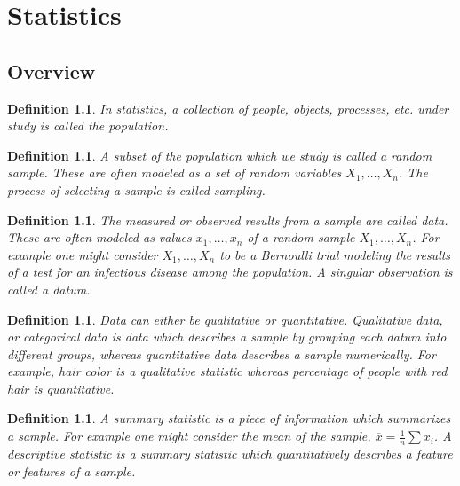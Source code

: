 \documentclass[1pt]{report}
\newtheorem{defn}[thm]{Definition}
\newcommand{\<}{\langle}
\renewcommand{\>}{\rangle}
\renewcommand{\bar}{\overline}
\begin{document}
\part{Statistics}
\chapter{Overview}
\begin{defn}\label{def:population}
In statistics, a collection of people, objects, processes, etc. under study is called the \emph{population}.
\end{defn}
\begin{defn}\label{def:sample}
A subset of the population which we study is called a \emph{random sample}. These are often modeled as a set of random variables $X_1, \dots, X_n$. The process of selecting a sample is called \emph{sampling}.
\end{defn}
\begin{defn}\label{def:data}
The measured or observed results from a sample are called \emph{data}. These are often modeled as values $x_1,\dots, x_n$ of a random sample $X_1,\dots, X_n$. For example one might consider $X_1,\dots, X_n$ to be a Bernoulli trial modeling the results of a test for an infectious disease among the population. A singular observation is called a \emph{datum}. 
\end{defn}
\begin{defn}\label{def:typesofdata}
Data can either be \emph{qualitative} or \emph{quantitative}. Qualitative data, or \emph{categorical data} is data which describes a sample by grouping each datum into different groups, whereas quantitative data describes a sample numerically. For example, hair color is a qualitative statistic whereas percentage of people with red hair is quantitative.
\end{defn}
\begin{defn}\label{def:summarystatistic}
A \emph{summary statistic} is a piece of information which summarizes a sample. For example one might consider the mean of the sample, $\bar x = \frac{1}{n} \sum x_i$. A \emph{descriptive statistic} is a summary statistic which quantitatively describes a feature or features of a sample.
\end{defn}
\end{document}
